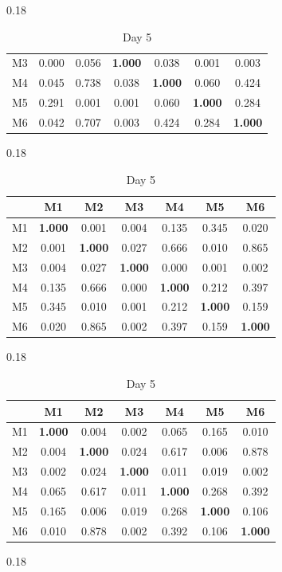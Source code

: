 \begin{table}[htbp]
\begin{subtable}[t]{0.18\linewidth}
\begin{tabular}{ccccccc}
M3 & 0.000 & 0.056 & \textbf{1.000} & 0.038 & 0.001 & 0.003 \\
M4 & 0.045 & 0.738 & 0.038 & \textbf{1.000} & 0.060 & 0.424 \\
M5 & 0.291 & 0.001 & 0.001 & 0.060 & \textbf{1.000} & 0.284 \\
M6 & 0.042 & 0.707 & 0.003 & 0.424 & 0.284 & \textbf{1.000} \\
\bottomrule
\end{tabular}
\end{subtable}
\hfill
\begin{subtable}[t]{0.18\linewidth}
\centering
\caption*{Day 4}
\begin{tabular}{ccccccc}
\toprule
& M1 & M2 & M3 & M4 & M5 & M6 \\
\midrule
M1 & \textbf{1.000} & 0.001 & 0.004 & 0.135 & 0.345 & 0.020 \\
M2 & 0.001 & \textbf{1.000} & 0.027 & 0.666 & 0.010 & 0.865 \\
M3 & 0.004 & 0.027 & \textbf{1.000} & 0.000 & 0.001 & 0.002 \\
M4 & 0.135 & 0.666 & 0.000 & \textbf{1.000} & 0.212 & 0.397 \\
M5 & 0.345 & 0.010 & 0.001 & 0.212 & \textbf{1.000} & 0.159 \\
M6 & 0.020 & 0.865 & 0.002 & 0.397 & 0.159 & \textbf{1.000} \\
\bottomrule
\end{tabular}
\end{subtable}
\hfill
\begin{subtable}[t]{0.18\linewidth}
\centering
\caption*{Day 5}
\begin{tabular}{ccccccc}
\toprule
& M1 & M2 & M3 & M4 & M5 & M6 \\
\midrule
M1 & \textbf{1.000} & 0.004 & 0.002 & 0.065 & 0.165 & 0.010 \\
M2 & 0.004 & \textbf{1.000} & 0.024 & 0.617 & 0.006 & 0.878 \\
M3 & 0.002 & 0.024 & \textbf{1.000} & 0.011 & 0.019 & 0.002 \\
M4 & 0.065 & 0.617 & 0.011 & \textbf{1.000} & 0.268 & 0.392 \\
M5 & 0.165 & 0.006 & 0.019 & 0.268 & \textbf{1.000} & 0.106 \\
M6 & 0.010 & 0.878 & 0.002 & 0.392 & 0.106 & \textbf{1.000} \\
\bottomrule
\end{tabular}
\end{subtable}
\hfill
\begin{subtable}[t]{0.18\linewidth}

\end{subtable}
\end{table}
